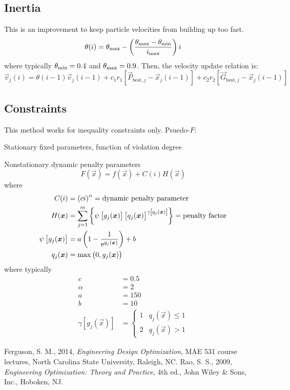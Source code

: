 \documentclass{article}
\begin{document}
\subsection*{Inertia}

This is an improvement to keep particle velocities from building up too fast.
\[\theta(i) = \theta_{\mathrm{max}} - \left(\frac{\theta_{\mathrm{max}} - \theta_{\mathrm{min}}}{i_{\mathrm{max}}}\right) i\]
where typically \(\theta_{\mathrm{min}} = 0.4\) and \(\theta_{\mathrm{max}} = 0.9\). Then, the velocity update relation is:
\[\vec{v}_j(i) = \theta(i - 1)\vec{v}_j(i - 1) + c_1r_1\left[\vec{P}_{\text{best},j} - \vec{x}_j(i-1)\right] + c_2r_2\left[\vec{G}_{\text{best},j} - \vec{x}_j(i - 1)\right]\]

\subsection*{Constraints}

This method works for inequality constraints only. Psuedo-\(F\):
\begin{description*}
\item[Stationary] fixed parameters, function of violation degree
\item[Nonstationary] dynamic penalty parameters
  \[F(\vec{x}) = f(\vec{x}) + C(i)H(\vec{x})\]
  where
  \begin{align*}
    C(i) &= {(ci)}^\alpha = \text{dynamic penalty parameter} \\
    H(\bm{x}) &= \sum_{j=1}^{m}{\left\{\psi\left[g_j(\bm{x})\right]{\left[q_j(\bm{x})\right]}^{\gamma\left[q_j(\bm{x})\right]}\right\}} = \text{penalty factor} \\
    \psi\left[g_j(\bm{x})\right] &= a\left(1 - \frac{1}{\mathrm{e}^{q_j(\bm{x})}}\right) + b \\
    q_j(\bm{x}) &= \max\left(0, g_j(\bm{x})\right) \\
  \end{align*}
  where typically
  \begin{align*}
    c &= 0.5 \\
    \alpha &= 2 \\
    a &= 150 \\
    b &= 10 \\
    \gamma\left[g_j(\vec{x})\right] &= \begin{cases}
      1 & q_j(\vec{x}) \le 1 \\
      2 & q_j(\vec{x}) > 1
    \end{cases}
  \end{align*}
\end{description*}

\begin{thebibliography}{99}
 Ferguson, S. M., 2014, \emph{Engineering Design Optimization}, MAE 531 course
  lectures, North Carolina State University, Raleigh, NC.
 Rao, S. S., 2009, \emph{Engineering Optimization: Theory and Practice}, 4th ed.,
  John Wiley \& Sons, Inc., Hoboken, NJ.
\end{thebibliography}
\end{document}
